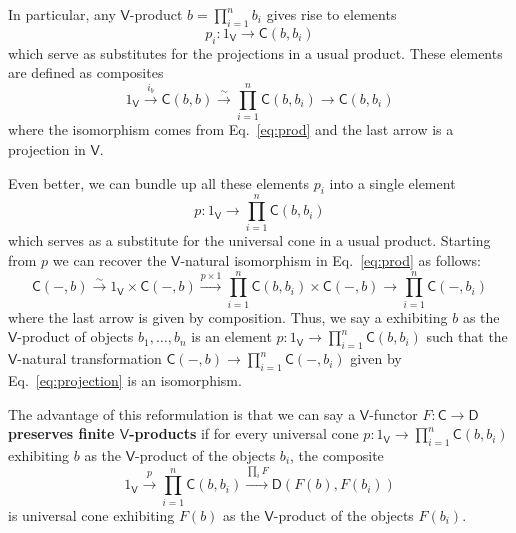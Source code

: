 \documentclass{amsart}
\newcommand{\define}[1]{{\bf \boldmath{#1}}}
\theoremstyle{definition}
\newcommand{\V}{\mathsf{V}}
\newcommand{\D}{\mathsf{D}}
\newcommand{\C}{\mathsf{C}}
\newcommand{\maps}{\colon}
\begin{document}
In particular, any $\V$-product $b = \prod_{i=1}^n b_i$ gives rise to elements
\[    p_i \maps 1_\V \to \C(b,b_i)  \]
which serve as substitutes for the projections in a usual product.   These elements
are defined as composites
\[    1_\V \stackrel{i_b}{\longrightarrow} \C(b,b) \stackrel{\sim}{\longrightarrow} \prod_{i=1}^n \C(b,b_i) \to \C(b,b_i)   \]
where the isomorphism comes from Eq.\ \eqref{eq:prod} and the last arrow is a projection in $\V$.

Even better, we can bundle up all these elements $p_i$ into a single element
\[    p \maps 1_\V \to \prod_{i=1}^n \C(b,b_i)  \]
which serves as a substitute for the universal cone in a usual product.  Starting from $p$ we can recover the $\V$-natural isomorphism in Eq.\ \eqref{eq:prod} as follows:
\begin{equation}
\label{eq:projection}    \C(-,b) \stackrel{\sim}{\longrightarrow} 1_\V \times \C(-,b)  
 \xrightarrow{p \times 1} \prod_{i=1}^n \C(b,b_i) \times \C(-,b) \longrightarrow \prod_{i=1}^n \C(-,b_i)
 \end{equation}
 where the last arrow is given by composition.   Thus, we say a \define{universal cone} exhibiting $b$ as the $\V$-product of objects $b_1, \dots, b_n$ is an element $p \maps 1_\V \to \prod_{i=1}^n \C(b,b_i)$ such that the $\V$-natural transformation $\C(-,b) \to \prod_{i=1}^n \C(-,b_i)$ given by Eq.\ \eqref{eq:projection} is an isomorphism.

The advantage of this reformulation is that we can say a $\V$-functor $F \maps \C \to \D$ \textbf{preserves finite $\V$-products} if for every universal cone $p \maps 1_\V \to \prod_{i=1}^n \C(b,b_i)$ exhibiting $b$ as the $\V$-product of the objects $b_i$, the composite
\[       1_\V \stackrel{p}{\longrightarrow} \prod_{i=1}^n \C(b,b_i) \xrightarrow{\prod_i F} \D(F(b),F(b_i)) \]
is universal cone exhibiting $F(b)$ as the $\V$-product of the objects $F(b_i)$.
\end{document}
